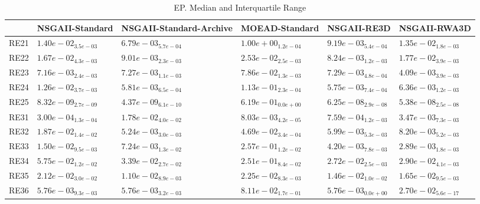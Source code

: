 \documentclass{article}
\begin{document}
\begin{table}
\caption{EP. Median and Interquartile Range}
\label{table: EP}
\centering
\begin{scriptsize}
\begin{tabular}{llllll}
\hline & NSGAII-Standard & NSGAII-Standard-Archive & MOEAD-Standard & NSGAII-RE3D &  NSGAII-RWA3D\\
\hline 
RE21 & $  1.40e-02_{ 3.5e-03}$ & \cellcolor{gray95}$  6.79e-03_{ 5.7e-04}$ & $  1.00e+00_{ 1.2e-04}$ & \cellcolor{gray25}$  9.19e-03_{ 5.4e-04}$ & $  1.35e-02_{ 1.8e-03}$ \\
RE22 & $  1.67e-02_{ 4.3e-03}$ & \cellcolor{gray25}$  9.01e-03_{ 2.3e-03}$ & $  2.53e-02_{ 2.5e-03}$ & \cellcolor{gray95}$  8.24e-03_{ 1.2e-03}$ & $  1.77e-02_{ 3.9e-03}$ \\
RE23 & \cellcolor{gray25}$  7.16e-03_{ 2.4e-03}$ & $  7.27e-03_{ 1.1e-03}$ & $  7.86e-02_{ 1.3e-03}$ & $  7.29e-03_{ 4.8e-04}$ & \cellcolor{gray95}$  4.09e-03_{ 3.9e-03}$ \\
RE24 & $  1.26e-02_{ 3.7e-03}$ & \cellcolor{gray25}$  5.81e-03_{ 6.5e-04}$ & $  1.13e-01_{ 2.3e-04}$ & \cellcolor{gray95}$  5.75e-03_{ 7.4e-04}$ & $  6.36e-03_{ 1.2e-03}$ \\
RE25 & \cellcolor{gray25}$  8.32e-09_{ 2.7e-09}$ & \cellcolor{gray95}$  4.37e-09_{ 6.1e-10}$ & $  6.19e-01_{ 0.0e+00}$ & $  6.25e-08_{ 2.9e-08}$ & $  5.38e-08_{ 2.5e-08}$ \\
RE31 & \cellcolor{gray95}$  3.00e-04_{ 1.3e-04}$ & $  1.78e-02_{ 4.0e-02}$ & $  8.03e-03_{ 4.2e-05}$ & \cellcolor{gray25}$  7.59e-04_{ 1.2e-03}$ & $  3.47e-03_{ 7.3e-03}$ \\
RE32 & $  1.87e-02_{ 1.4e-02}$ & \cellcolor{gray95}$  5.24e-03_{ 3.0e-03}$ & $  4.69e-02_{ 3.4e-04}$ & \cellcolor{gray25}$  5.99e-03_{ 5.3e-03}$ & $  8.20e-03_{ 5.2e-03}$ \\
RE33 & $  1.50e-02_{ 9.5e-03}$ & $  7.24e-03_{ 1.3e-02}$ & $  2.57e-01_{ 1.2e-02}$ & \cellcolor{gray25}$  4.20e-03_{ 7.8e-03}$ & \cellcolor{gray95}$  2.89e-03_{ 1.8e-03}$ \\
RE34 & $  5.75e-02_{ 1.2e-02}$ & $  3.39e-02_{ 2.7e-02}$ & $  2.51e-01_{ 8.4e-02}$ & \cellcolor{gray95}$  2.72e-02_{ 2.5e-03}$ & \cellcolor{gray25}$  2.90e-02_{ 4.1e-03}$ \\
RE35 & $  2.12e-02_{ 3.0e-02}$ & \cellcolor{gray95}$  1.10e-02_{ 8.9e-03}$ & $  2.25e-02_{ 8.3e-03}$ & \cellcolor{gray25}$  1.46e-02_{ 1.0e-02}$ & $  1.65e-02_{ 9.5e-03}$ \\
RE36 & $  5.76e-03_{ 9.3e-03}$ & \cellcolor{gray25}$  5.76e-03_{ 3.2e-03}$ & $  8.11e-02_{ 1.7e-01}$ & \cellcolor{gray95}$  5.76e-03_{ 0.0e+00}$ & $  2.70e-02_{ 5.6e-17}$ \\

\end{tabular}
\end{scriptsize}
\end{table}
\end{document}
